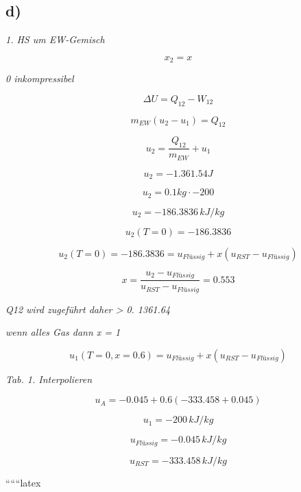 

\subsection*{d)}
\textit{1. HS um EW-Gemisch}

\[
x_2 = x
\]

\textit{0 inkompressibel}

\[
\Delta U = Q_{12} - W_{12}
\]

\[
m_{EW} (u_2 - u_1) = Q_{12}
\]

\[
u_2 = \frac{Q_{12}}{m_{EW}} + u_1
\]

\[
u_2 = -1.361.54 J
\]

\[
u_2 = 0.1 kg \cdot -200
\]

\[
u_2 = -186.3836 \, kJ/kg
\]

\[
u_2 (T = 0) = -186.3836
\]

\[
u_2 (T = 0) = -186.3836 = u_{Flüssig} + x \left( u_{RST} - u_{Flüssig} \right)
\]

\[
x = \frac{u_2 - u_{Flüssig}}{u_{RST} - u_{Flüssig}} = 0.553
\]

\textit{Q12 wird zugeführt daher > 0. 1361.64}

\textit{wenn alles Gas dann x = 1}

\[
u_1 (T = 0, x = 0.6) = u_{Flüssig} + x \left( u_{RST} - u_{Flüssig} \right)
\]

\textit{Tab. 1. Interpolieren}

\[
u_{A} = -0.045 + 0.6 \left( -333.458 + 0.045 \right)
\]

\[
u_1 = -200 \, kJ/kg
\]

\[
u_{Flüssig} = -0.045 \, kJ/kg
\]

\[
u_{RST} = -333.458 \, kJ/kg
\]

``````latex